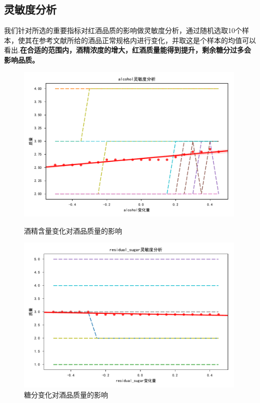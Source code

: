 \documentclass{whutmod}
\begin{document}
\subsection{灵敏度分析}
我们针对所选的重要指标对红酒品质的影响做灵敏度分析，通过随机选取10个样本，使其在参考文献所给的酒品正常规格内进行变化，并取这是个样本的均值可以看出.\textbf{在合适的范围内，酒精浓度的增大，红酒质量能得到提升，剩余糖分过多会影响品质。}
\begin{figure}[!h]
	\begin{minipage}[t]{0.48\textwidth}
		\centering
		\includegraphics[width=0.99\textwidth]{sensitivity_alcohol.pdf}
		\caption{酒精含量变化对酒品质量的影响}
	\end{minipage}
	\begin{minipage}[t]{0.48\textwidth}
		\centering
			\includegraphics[width=0.99\textwidth]{sensitivity_residual_sugar.pdf}
		\caption{糖分变化对酒品质量的影响}
	\end{minipage}
\end{figure}
\end{document}
